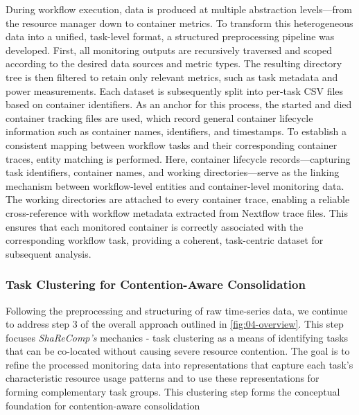 During workflow execution, data is produced at multiple abstraction levels—from the resource manager down to container metrics. To transform this heterogeneous data into a unified, task-level format, a structured preprocessing pipeline was developed. First, all monitoring outputs are recursively traversed and scoped according to the desired data sources and metric types. The resulting directory tree is then filtered to retain only relevant metrics, such as task metadata and power measurements. Each dataset is subsequently split into per-task CSV files based on container identifiers.
As an anchor for this process, the started and died container tracking files are used, which record general container lifecycle information such as container names, identifiers, and timestamps. To establish a consistent mapping between workflow tasks and their corresponding container traces, entity matching is performed. Here, container lifecycle records—capturing task identifiers, container names, and working directories—serve as the linking mechanism between workflow-level entities and container-level monitoring data. The working directories are attached to every container trace, enabling a reliable cross-reference with workflow metadata extracted from Nextflow trace files. This ensures that each monitored container is correctly associated with the corresponding workflow task, providing a coherent, task-centric dataset for subsequent analysis.

\subsubsection{Task Clustering for Contention-Aware Consolidation}
\label{sec:task_clustering}

Following the preprocessing and structuring of raw time-series data, we continue to address step 3 of the overall approach outlined in \ref{fig:04-overview}. This step focuses \textit{ShaReComp's} mechanics - task clustering as a means of identifying tasks that can be co-located without causing severe resource contention. The goal is to refine the processed monitoring data into representations that capture each task's characteristic resource usage patterns and to use these representations for forming complementary task groups. This clustering step forms the conceptual foundation for contention-aware consolidation

\label{sec:data_preprocessing_clustering}

